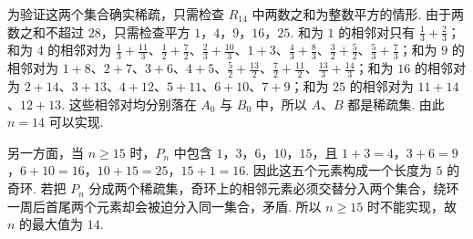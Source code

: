 \begin{problem}
\begin{solution}
\begin{enumerate}
为验证这两个集合确实稀疏，只需检查 \(R_{14}\) 中两数之和为整数平方的情形. 由于两数之和不超过 \(28\)，只需检查平方 \(1\)，\(4\)，\(9\)，\(16\)，\(25\). 和为 \(1\) 的相邻对只有 \(\frac13+\frac23\)；和为 \(4\) 的相邻对为 \(\frac13+\frac{11}{3}\)、\(\frac12+\frac72\)、\(\frac23+\frac{10}{3}\)、\(1+3\)、\(\frac43+\frac83\)、\(\frac32+\frac52\)、\(\frac53+\frac73\)；和为 \(9\) 的相邻对为 \(1+8\)、\(2+7\)、\(3+6\)、\(4+5\)、\(\frac52+\frac{13}{2}\)、\(\frac72+\frac{11}{2}\)、\(\frac{13}{3}+\frac{14}{3}\)；和为 \(16\) 的相邻对为 \(2+14\)、\(3+13\)、\(4+12\)、\(5+11\)、\(6+10\)、\(7+9\)；和为 \(25\) 的相邻对为 \(11+14\)、\(12+13\). 这些相邻对均分别落在 \(A_0\) 与 \(B_0\) 中，所以 \(A\)、\(B\) 都是稀疏集. 由此 \(n=14\) 可以实现.

另一方面，当 \(n\geqslant15\) 时，\(P_n\) 中包含 \(1\)，\(3\)，\(6\)，\(10\)，\(15\)，且
\(1+3=4\)，\(3+6=9\)，\(6+10=16\)，\(10+15=25\)，\(15+1=16\).
因此这五个元素构成一个长度为 \(5\) 的奇环. 若把 \(P_n\) 分成两个稀疏集，奇环上的相邻元素必须交替分入两个集合，绕环一周后首尾两个元素却会被迫分入同一集合，矛盾. 所以 \(n\geqslant15\) 时不能实现，故 \(n\) 的最大值为 \(14\).
\end{enumerate}
\end{solution}

\end{problem}
